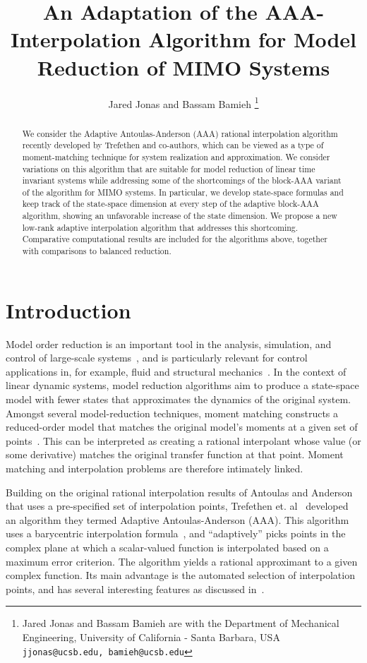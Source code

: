 \documentclass[letterpaper, 10 pt, conference]{ieeeconf}  %
\title{\LARGE \bf
An Adaptation of the AAA-Interpolation Algorithm for Model  Reduction  of MIMO Systems
}
\author{Jared Jonas and Bassam Bamieh%
\thanks{Jared Jonas and Bassam Bamieh are with the Department of Mechanical Engineering, University of California - Santa Barbara, USA 
{\tt\small jjonas@ucsb.edu, bamieh@ucsb.edu}}%
}
\begin{document}
\maketitle
\thispagestyle{empty}
\pagestyle{empty}

\begin{abstract}
We consider the Adaptive Antoulas-Anderson (AAA) rational interpolation algorithm recently developed by Trefethen and co-authors,  
which can be viewed as a type of moment-matching technique for system realization and approximation. We consider variations 
on this algorithm that are suitable for model reduction of linear time invariant systems while addressing some of the shortcomings 
of the block-AAA variant of the algorithm for MIMO systems. In particular, we develop state-space formulas and keep track of the state-space dimension at every step of the adaptive block-AAA algorithm, showing an unfavorable increase of the state dimension.  We propose  a new low-rank adaptive  interpolation algorithm that addresses this shortcoming. 
Comparative  computational results are included for the algorithms above, together with comparisons to balanced reduction.  
\end{abstract}

\section{Introduction}
Model order reduction is an important tool in the analysis, simulation, and control of large-scale systems~\cite{antoulas2000survey,Baur14}, and is particularly relevant for control applications in, for example, fluid and structural mechanics~\cite{Lassila14,Hetmaniuk12}.  In the context of linear dynamic systems, model reduction algorithms aim to produce a state-space model with fewer states that approximates the dynamics of the original system.  
Amongst several model-reduction techniques, moment matching  constructs a reduced-order model that matches the original model's moments at a given set of points~\cite{ionescu_astolfi_2011}.  This can be interpreted  as creating a rational interpolant whose value (or some derivative) matches the original transfer function at that point. Moment matching and interpolation problems are therefore intimately linked. 

Building on the original rational interpolation results of Antoulas and Anderson~\cite{antoulas1986scalar} 
that uses a 
pre-specified set of interpolation points, Trefethen et. al~\cite{Nakatsukasa_2018} developed an algorithm they termed Adaptive Antoulas-Anderson (AAA). This algorithm uses  a barycentric interpolation formula~\cite{berrut_trefethen_2004}, and ``adaptively'' picks points in the complex plane at which a scalar-valued  function is interpolated based on a maximum error criterion. The algorithm yields a rational approximant to a given complex function. 
Its main advantage is the automated selection of interpolation points, and has several interesting features as discussed in~\cite{Nakatsukasa_2018}. 
\end{document}
